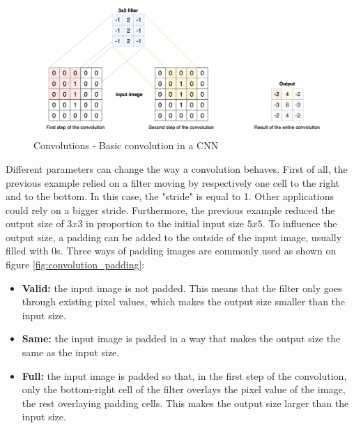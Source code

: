 \begin{figure}[!h]
\centering
\includegraphics[width=1\textwidth, keepaspectratio=true]{./figures/convolution.png}
\caption{Convolutions - Basic convolution in a CNN}
\label{fig:convolution}
\end{figure}

Different parameters can change the way a convolution behaves. First of all, the previous example relied on a filter moving by respectively one cell to the right and to the bottom. In this case, the "stride" is equal to 1. Other applications could rely on a bigger stride. Furthermore, the previous example reduced the output size of $3x3$ in proportion to the initial input size $5x5$. To influence the output size, a padding can be added to the outside of the input image, usually filled with 0s. Three ways of padding images are commonly used as shown on figure \ref{fig:convolution_padding}:
\begin{itemize}
	\item \textbf{Valid:} the input image is not padded. This means that the filter only goes through existing pixel values, which makes the output size smaller than the input size. 
	
	\item \textbf{Same:} the input image is padded in a way that makes the output size the same as the input size.
	
	\item \textbf{Full:} the input image is padded so that, in the first step of the convolution, only the bottom-right cell of the filter overlays the pixel value of the image, the rest overlaying padding cells. This makes the output size larger than the input size. 
\end{itemize}

